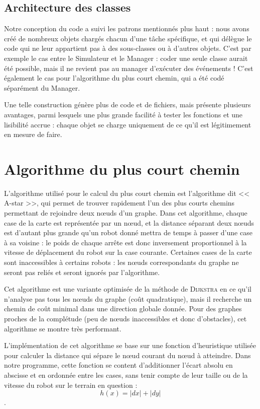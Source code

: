 \documentclass[a4paper,11pt]{article}
\begin{document}
\subsection{Architecture des classes}
Notre conception du code a suivi les patrons mentionnés plus haut : nous avons créé de nombreux objets chargés chacun d'une tâche spécifique, et qui délègue le code qui ne leur appartient pas à des sous-classes ou à d'autres objets. C'est par exemple le cas entre le Simulateur et le Manager : coder une seule classe aurait été possible, mais il ne revient pas au manager d'exécuter des événements ! C'est également le cas pour l'algorithme du plus court chemin, qui a été codé séparément du Manager.

Une telle construction génère plus de code et de fichiers, mais présente plusieurs avantages, parmi lesquels une plus grande facilité à tester les fonctions et une lisibilité accrue : chaque objet se charge uniquement de ce qu'il est légitimement en mesure de faire.

\section{Algorithme du plus court chemin}
L'algorithme utilisé pour le calcul du plus court chemin est l'algorithme dit << A-star >>, qui permet de trouver rapidement l'un des plus courts chemins permettant de rejoindre deux n\oe uds d'un graphe. Dans cet algorithme, chaque case de la carte est représentée par un n\oe ud, et la distance séparant deux n\oe uds est d'autant plus grande qu'un robot donné mettra de temps à passer d'une case à sa voisine : le poids de chaque arrête est donc inversement proportionnel à la vitesse de déplacement du robot sur la case courante. Certaines cases de la carte sont inaccessibles à certains robots : les n\oe uds correspondants du graphe ne seront pas reliés et seront ignorés par l'algorithme.

\vspace{\baselineskip}
Cet algorithme est une variante optimisée de la méthode de \textsc{Dijkstra} en ce qu'il n'analyse pas tous les n\oe uds du graphe (coût quadratique), mais il recherche un chemin de coût minimal dans une direction globale donnée. Pour des graphes proches de la complétude (peu de n\oe uds inaccessibles et donc d'obstacles), cet algorithme se montre très performant.

\vspace{\baselineskip}
L'implémentation de cet algorithme se base sur une fonction d'heuristique utilisée pour calculer la distance qui sépare le n\oe ud courant du n\oe ud à atteindre. Dans notre programme, cette fonction se content d'additionner l'écart absolu en abscisse et en ordonnée entre les cases, sans tenir compte de leur taille ou de la vitesse du robot sur le terrain en question :
\[h(x) = |dx|+|dy|\].
\end{document}
